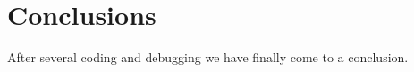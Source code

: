\chapter{Conclusions}
\label{chap:conclusions}

After several coding and debugging we have finally come to a conclusion.
